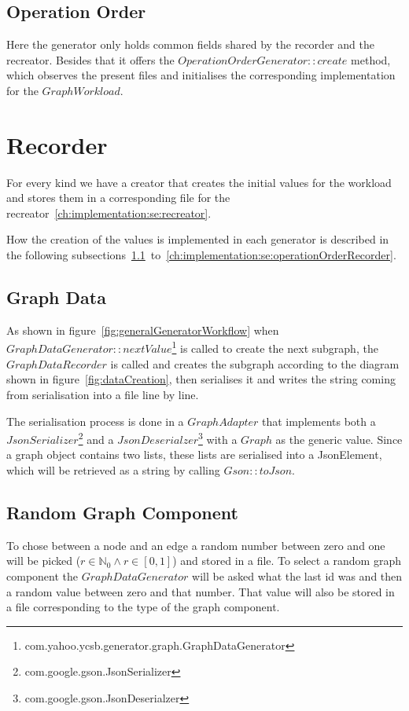 \subsection{Operation Order}
Here the generator only holds common fields shared by the recorder and the recreator.
Besides that it offers the $ OperationOrderGenerator::create $ method,
which observes the present files and initialises the corresponding implementation for the $ Graph Workload $.

\section{Recorder}
\label{ch:implementation:se:recorder}
For every kind we have a creator that creates the initial values for the workload and stores them in a corresponding file for the recreator~\ref{ch:implementation:se:recreator}.

How the creation of the values is implemented in each generator is described in the following subsections~\ref{ch:implementation:se:graphDataRecorder}~to~\ref{ch:implementation:se:operationOrderRecorder}.

\subsection{Graph Data}
\label{ch:implementation:se:graphDataRecorder}
As shown in figure~\ref{fig:generalGeneratorWorkflow} when $ GraphDataGenerator::nextValue $\footnote{com.yahoo.ycsb.generator.graph.GraphDataGenerator} is called to create the next subgraph,
the $ GraphDataRecorder $ is called and creates the subgraph according to the diagram shown in figure~\ref{fig:dataCreation},
then serialises it and writes the string coming from serialisation into a file line by line.

The serialisation process is done in a $ GraphAdapter $ that implements both a $ JsonSerializer $\footnote{com.google.gson.JsonSerializer} and a $ JsonDeserialzer $\footnote{com.google.gson.JsonDeserialzer} with a $ Graph $ as the generic value.
Since a graph object contains two lists,
these lists are serialised into a JsonElement,
which will be retrieved as a string by calling $ Gson::toJson $.

\subsection{Random Graph Component}
To chose between a node and an edge a random number between zero and one will be picked ($ r \in \mathbb{N}_0 \wedge r \in [ 0, 1 ] $) and stored in a file.
To select a random graph component the $ GraphDataGenerator $ will be asked what the last id was and then a random value between zero and that number.
That value will also be stored in a file corresponding to the type of the graph component.

